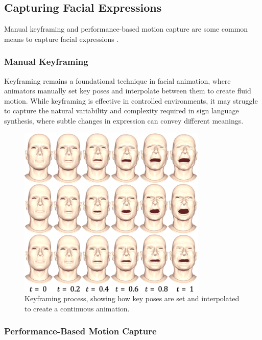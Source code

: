 \documentclass[../../main.tex]{subfiles}
\begin{document}
\subsection{Capturing Facial Expressions}
\label{ch:facial_expressions:related_work:face_rigging:capture}

Manual keyframing and performance-based motion capture are some common means to capture facial expressions .

\subsubsection{Manual Keyframing}
\label{ch:facial_expressions:related_work:face_rigging:capture:manual_keyframing}

Keyframing remains a foundational technique in facial animation, where animators manually set key poses and interpolate between them to create fluid motion. While keyframing is effective in controlled environments, it may struggle to capture the natural variability and complexity required in sign language synthesis, where subtle changes in expression can convey different meanings.

\begin{figure}
    \centering
    \includegraphics[width=0.8\textwidth]{chapters/facial_expressions/images/keyframing.png}
    \caption{Keyframing process, showing how key poses are set and interpolated to create a continuous animation.}
    \label{ch:facial_expressions:fig:keyframing}
\end{figure}

\subsubsection{Performance-Based Motion Capture}
\label{ch:facial_expressions:related_work:face_rigging:capture:performance_based_motion_capture}
\end{document}
